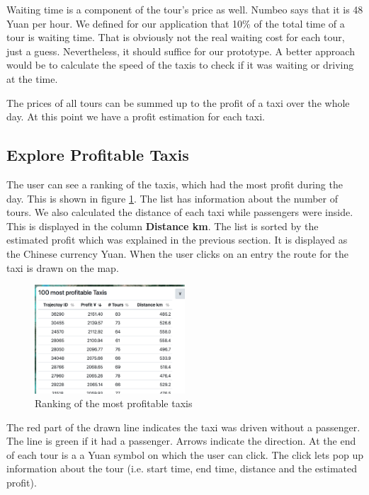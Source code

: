\documentclass[10pt]{sig-alternate}
\begin{document}
Waiting time is a component of the tour's price as well. Numbeo says that it is 48 Yuan per hour. We defined for our application that 10\% of the total time of a tour is waiting time. That is obviously not the real waiting cost for each tour, just a guess. Nevertheless, it should suffice for our prototype. A better approach would be to calculate the speed of the taxis to check if it was waiting or driving at the time.

The prices of all tours can be summed up to the profit of a taxi over the whole day. At this point we have a profit estimation for each taxi.

\subsection{Explore Profitable Taxis}

The user can see a ranking of the taxis, which had the most profit during the day. This is shown in figure \ref{fig:ranking}. The list has information about the number of tours. We also calculated the distance of each taxi while passengers were inside. This is displayed in the column \textbf{Distance km}. The list is sorted by the estimated profit which was explained in the previous section. It is displayed as the Chinese currency Yuan. When the user clicks on an entry the route for the taxi is drawn on the map.\\

\begin{figure}[ht]
\centering
\includegraphics[width=0.5\textwidth]{img/ranking.png}
\caption{Ranking of the most profitable taxis}
\label{fig:ranking}
\end{figure}

The red part of the drawn line indicates the taxi was driven without a passenger. The line is green if it had a passenger. Arrows indicate the direction. At the end of each tour is a a Yuan symbol on which the user can click. The click lets pop up information about the tour (i.e. start time, end time, distance and the estimated profit).\\
\end{document}
